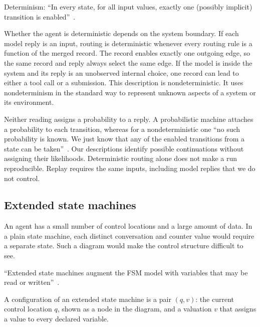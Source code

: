 \begin{definition}[Determinism]
\label{def:determinism}
Determinism: ``In every state, for all input values, exactly one (possibly implicit) transition is
enabled''~\citep[slide~29]{seshia2015discrete}.
\end{definition}

Whether the agent is deterministic depends on the system boundary. If each model reply is an
input, routing is deterministic whenever every routing rule is a function of the merged record.
The record enables exactly one outgoing edge, so the same record and reply always select the same
edge. If the model is inside the system and its reply is an unobserved internal choice, one record
can lead to either a tool call or a submission. This description is nondeterministic. It uses
nondeterminism in the standard way to represent unknown aspects of a system or its environment.

Neither reading assigns a probability to a reply. A probabilistic machine attaches a probability to
each transition, whereas for a nondeterministic one ``no such probability is known. We just know that
any of the enabled transitions from a state can be taken''~\citep[slides~33 and~37]{seshia2015discrete}.
Our descriptions identify possible continuations without assigning their likelihoods.
Deterministic routing alone does not make a run reproducible. Replay requires the same inputs,
including model replies that we do not control.

\subsection{Extended state machines}
\label{sec:efsm-extended}

An agent has a small number of control locations and a large amount of data. In a plain state
machine, each distinct conversation and counter value would require a separate state. Such a
diagram would make the control structure difficult to see.

\begin{definition}
\label{def:efsm}
``Extended state machines augment the FSM model with variables that may be read or
written''~\citep[slide~4]{seshia2015extended}.
\end{definition}

\begin{definition}[Configuration]
\label{def:configuration}
A configuration of an extended state machine is a pair $(q, v)$: the current control location $q$,
shown as a node in the diagram, and a valuation $v$ that assigns a value to every declared variable.
\end{definition}

